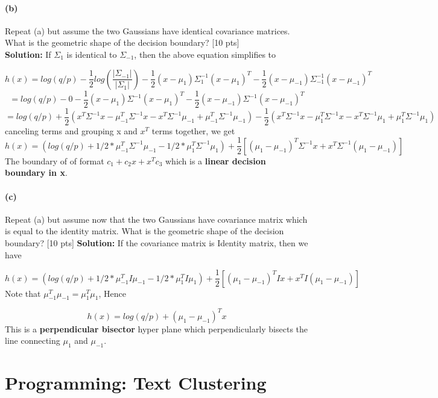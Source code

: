 \documentclass[twoside,10pt]{article}
\begin{document}
\paragraph{(b)} Repeat (a) but assume the two Gaussians have identical
covariance matrices. What is the geometric shape of the decision
boundary? [10 pts]\\
\textbf{ Solution: } 
If $\Sigma_{1}$ is identical to $\Sigma_{-1}$, then the above equation simplifies to 

$$
h(x) = log(q/p)  - \frac{1}{2}log(\frac{|\Sigma_{-1}|}{|\Sigma_{1}|})- \frac{1}{2}(x-\mu_1)\Sigma_1^{-1}(x-\mu_1)^T- \frac{1}{2}(x-\mu_{-1})\Sigma_{-1}^{-1}(x-\mu_{-1})^T
$$
$$
= log(q/p) - 0 - \frac{1}{2}(x-\mu_1)\Sigma^{-1}(x-\mu_1)^T- \frac{1}{2}(x-\mu_{-1})\Sigma^{-1}(x-\mu_{-1})^T
$$
$$
= log(q/p) + \frac{1}{2}(x^T\Sigma^{-1}x - \mu_{-1}^T\Sigma^{-1}x - x^T\Sigma^{-1}\mu_{-1} + \mu_{-1}^T\Sigma^{-1}\mu_{-1}) 
- \frac{1}{2}(x^T\Sigma^{-1}x - \mu_{1}^T\Sigma^{-1}x - x^T\Sigma^{-1}\mu_{1} + \mu_{1}^T\Sigma^{-1}\mu_{1})
$$
canceling terms and grouping x and $x^T$ terms together, we get
$$\boxed{h(x) = (log(q/p) + 1/2* \mu_{-1}^T\Sigma^{-1}\mu_{-1} - 1/2* \mu_{1}^T\Sigma^{-1}\mu_{1} )
+ \frac{1}{2}[(\mu_{1} - \mu_{-1})^T\Sigma^{-1}x + x^T\Sigma^{-1}(\mu_{1} - \mu_{-1})] }$$
The boundary of of format $c_1 + c_2 x+ x^Tc_3$ which is a \textbf{linear decision boundary in x}.

\paragraph{(c)} Repeat (a) but assume now that the two Gaussians have covariance
matrix which is equal to the identity matrix. What is the geometric
shape of the decision boundary? [10 pts]
\textbf{ Solution: } 
If the covariance matrix is Identity matrix, then we have 

$$
h(x) = (log(q/p) + 1/2* \mu_{-1}^T I \mu_{-1} - 1/2* \mu_{1}^T I \mu_{1} )
+ \frac{1}{2}[(\mu_{1} - \mu_{-1})^T I x + x^T I (\mu_{1} - \mu_{-1})]
$$
Note that $\mu_{-1}^T \mu_{-1} = \mu_{1}^T \mu_{1} $, Hence

$$
\boxed{h(x) = log(q/p)+ (\mu_{1} - \mu_{-1})^T x }
$$
This is a \textbf{perpendicular bisector} hyper plane which perpendicularly bisects the line connecting $\mu_{1}$ and $\mu_{-1}$.


\newpage

\section{Programming: Text Clustering}
\end{document}
